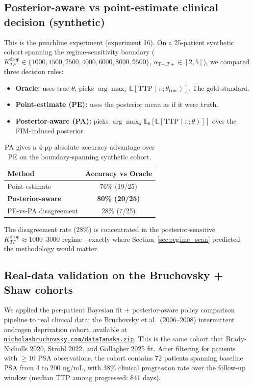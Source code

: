 \documentclass[11pt]{article}
\newcommand{\E}{\mathbb{E}}
\newcommand{\TTP}{\mathrm{TTP}}
\newcommand{\Kdrop}{K_{TP}^{\text{drop}}}
\newcommand{\Tplus}{T{+}}
\newcommand{\Tminus}{T{-}}
\begin{document}
\subsection{Posterior-aware vs point-estimate clinical decision (synthetic)}\label{sec:pa_vs_pe_synthetic}

This is the punchline experiment (experiment 16). On a 25-patient synthetic
cohort spanning the regime-sensitivity boundary
($\Kdrop \in \{1000, 1500, 2500, 4000, 6000, 8000, 9500\}$,
$\alpha_{\Tminus,\Tplus} \in [2, 5]$), we compared three decision rules:
\begin{itemize}
\item \textbf{Oracle:} uses true $\theta$, picks $\arg\max_\pi \E[\TTP(\pi; \theta_\text{true})]$. The gold standard.
\item \textbf{Point-estimate (PE):} uses the posterior mean as if it were truth.
\item \textbf{Posterior-aware (PA):} picks $\arg\max_\pi \E_\theta[\E[\TTP(\pi; \theta)]]$ over the FIM-induced posterior.
\end{itemize}

\begin{table}[h]
\centering
\begin{tabular}{lc}
\toprule
Method & Accuracy vs Oracle \\
\midrule
Point-estimate & 76\% (19/25) \\
\textbf{Posterior-aware} & \textbf{80\% (20/25)} \\
PE-vs-PA disagreement & 28\% (7/25) \\
\bottomrule
\end{tabular}
\caption{PA gives a 4-pp absolute accuracy advantage over PE on the
boundary-spanning synthetic cohort.}
\end{table}

The disagreement rate (28\%) is concentrated in the posterior-sensitive
$\Kdrop \approx 1000$--$3000$ regime---exactly where Section~\ref{sec:regime_scan}
predicted the methodology would matter.

\subsection{Real-data validation on the Bruchovsky + Shaw cohorts}\label{sec:real_data}

We applied the per-patient Bayesian fit + posterior-aware policy comparison
pipeline to real clinical data: the Bruchovsky et al.\ (2006--2008) intermittent
androgen deprivation cohort, available at
\href{http://www.nicholasbruchovsky.com/dataTanaka.zip}{\texttt{nicholasbruchovsky.com/dataTanaka.zip}}.
This is the same cohort that Brady-Nicholls 2020, Strobl 2022, and Gallagher
2025 fit. After filtering for patients with $\ge 10$ PSA observations, the
cohort contains 72 patients spanning baseline PSA from 4 to 200 ng/mL, with 38\%
clinical progression rate over the follow-up window (median TTP among progressed:
841 days).
\end{document}
